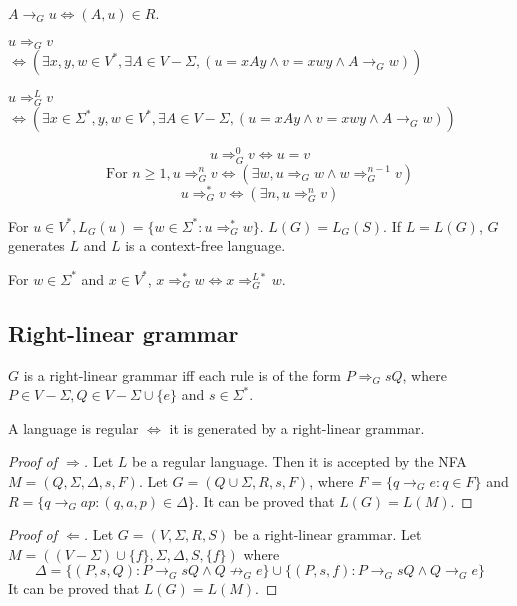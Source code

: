 \begin{definition}[$\rightarrow_G$]
$A \rightarrow_G u \iff (A, u) \in R$.
\end{definition}
\begin{definition}[$\Rightarrow_G$]
$u \Rightarrow_G v$\\
$\iff (\exists x,y,w \in V^*, \exists A \in V - \Sigma,
(u = xAy \wedge v = xwy \wedge A \rightarrow_G w))$
\end{definition}
\begin{definition}[$\Rightarrow_G^L$]
$u \Rightarrow_G^L v$\\
$\iff (\exists x \in \Sigma^*, y, w \in V^*, \exists A \in V - \Sigma,
(u = xAy \wedge v = xwy \wedge A \rightarrow_G w))$
\end{definition}
\begin{definition}[$\Rightarrow_G^n$]
\[ u \Rightarrow_G^0 v \iff u = v \]
\[ \textrm{For } n \ge 1, u \Rightarrow_G^n v \iff (\exists w, u \Rightarrow_G w \wedge w \Rightarrow_G^{n-1} v) \]
\[ u \Rightarrow_G^* v \iff (\exists n, u \Rightarrow_G^n v) \]
\end{definition}
\begin{definition}
For $u \in V^*, L_G(u) = \{w \in \Sigma^*: u \Rightarrow_G^* w \}$.
$L(G) = L_G(S)$.
If $L = L(G)$, $G$ generates $L$ and $L$ is a context-free language.
\end{definition}
\begin{theorem}
For $w \in \Sigma^*$ and $x \in V^*$, $x \Rightarrow_G^* w \iff x \Rightarrow _G^{L*} w$.
\end{theorem}

\subsection{Right-linear grammar}

\begin{definition}
$G$ is a right-linear grammar iff each rule is of the form $P \Rightarrow_G sQ$,
where $P \in V - \Sigma, Q \in V - \Sigma \cup \{e\}$ and $s \in \Sigma^*$.
\end{definition}
\begin{theorem}A language is regular $\iff$ it is generated by a right-linear grammar.\end{theorem}
\begin{proof}[Proof of $\Rightarrow$]
Let $L$ be a regular language. Then it is accepted by the NFA $M = (Q, \Sigma, \Delta, s, F)$.
Let $G = (Q \cup \Sigma, R, s, F)$, where $F = \{q \rightarrow_G e: q \in F\}$
and $R = \{q \rightarrow_G ap: (q, a, p) \in \Delta\}$.
It can be proved that $L(G) = L(M)$.
\end{proof}
\begin{proof}[Proof of $\Leftarrow$]
Let $G = (V, \Sigma, R, S)$ be a right-linear grammar.
Let $M = ((V-\Sigma) \cup \{f\}, \Sigma, \Delta, S, \{f\})$ where
\[ \Delta = \{(P, s, Q): P \rightarrow_G sQ \wedge Q \not\rightarrow_G e \}
\cup \{(P, s, f): P \rightarrow_G sQ \wedge Q \rightarrow_G e \} \]
It can be proved that $L(G) = L(M)$.
\end{proof}

